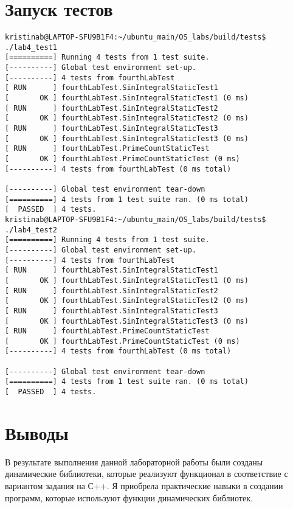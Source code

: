 \documentclass[a4paper, 12pt]{article}
\begin{document}
\section{Запуск тестов}
\begin{verbatim}
kristinab@LAPTOP-SFU9B1F4:~/ubuntu_main/OS_labs/build/tests$ ./lab4_test1
[==========] Running 4 tests from 1 test suite.
[----------] Global test environment set-up.
[----------] 4 tests from fourthLabTest
[ RUN      ] fourthLabTest.SinIntegralStaticTest1
[       OK ] fourthLabTest.SinIntegralStaticTest1 (0 ms)
[ RUN      ] fourthLabTest.SinIntegralStaticTest2
[       OK ] fourthLabTest.SinIntegralStaticTest2 (0 ms)
[ RUN      ] fourthLabTest.SinIntegralStaticTest3
[       OK ] fourthLabTest.SinIntegralStaticTest3 (0 ms)
[ RUN      ] fourthLabTest.PrimeCountStaticTest
[       OK ] fourthLabTest.PrimeCountStaticTest (0 ms)
[----------] 4 tests from fourthLabTest (0 ms total)

[----------] Global test environment tear-down
[==========] 4 tests from 1 test suite ran. (0 ms total)
[  PASSED  ] 4 tests.
kristinab@LAPTOP-SFU9B1F4:~/ubuntu_main/OS_labs/build/tests$ ./lab4_test2
[==========] Running 4 tests from 1 test suite.
[----------] Global test environment set-up.
[----------] 4 tests from fourthLabTest
[ RUN      ] fourthLabTest.SinIntegralStaticTest1
[       OK ] fourthLabTest.SinIntegralStaticTest1 (0 ms)
[ RUN      ] fourthLabTest.SinIntegralStaticTest2
[       OK ] fourthLabTest.SinIntegralStaticTest2 (0 ms)
[ RUN      ] fourthLabTest.SinIntegralStaticTest3
[       OK ] fourthLabTest.SinIntegralStaticTest3 (0 ms)
[ RUN      ] fourthLabTest.PrimeCountStaticTest
[       OK ] fourthLabTest.PrimeCountStaticTest (0 ms)
[----------] 4 tests from fourthLabTest (0 ms total)

[----------] Global test environment tear-down
[==========] 4 tests from 1 test suite ran. (0 ms total)
[  PASSED  ] 4 tests.
\end{verbatim}
\newpage

\section{Выводы}

В результате выполнения данной лабораторной работы были созданы динамические библиотеки, которые реализуют функционал в соответствие с вариантом задания на С++. Я приобрела практические навыки в создании программ, которые используют функции динамических библиотек.
\end{document}
